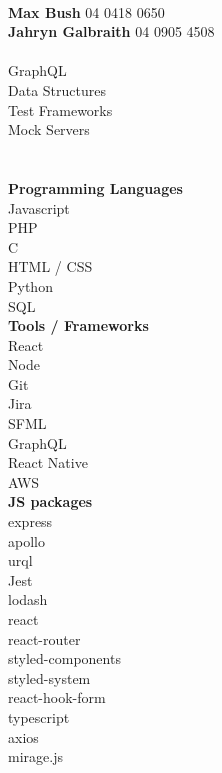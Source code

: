 \documentclass[8pt]{developercv}
\newcommand{\CC}{C\nolinebreak\hspace{-.05em}\raisebox{.4ex}{\tiny\bf +}\nolinebreak\hspace{-.10em}\raisebox{.4ex}{\tiny\bf +}}
\def\CC{{C\nolinebreak[4]\hspace{-.05em}\raisebox{.4ex}{\tiny\bf ++}}}
\begin{document}
	\begin{minipage}[t]{0.3\textwidth}		%
		\\
		\textbf{Max Bush} 04 0418 0650\\
		\textbf{Jahryn Galbraith} 04 0905 4508\\

		\\
		{GraphQL}\\
		{Data Structures}\\
		{Test Frameworks}\\
		{Mock Servers}\\
		
		\\
		\\\textbf{Programming Languages}\\
		{Javascript}\\
		{PHP}\\
		{\CC}\\
		{HTML / CSS}\\
		{Python}\\
		{SQL}\\

		\textbf{Tools / Frameworks}\\
		{React}\\
		{Node}\\
		{Git}\\
		{Jira}\\
		{SFML}\\
		{GraphQL}\\
		{React Native}\\
		{AWS}\\
		
		\textbf{JS packages}\\
		{express}\\
		{apollo}\\
		{urql}\\
		{Jest}\\
		{lodash}\\
		{react}\\
		{react-router}\\
		{styled-components}\\
		{styled-system}\\
		{react-hook-form}\\
		{typescript}\\
		{axios}\\
		{mirage.js}\\

	\end{minipage}
\end{document}
